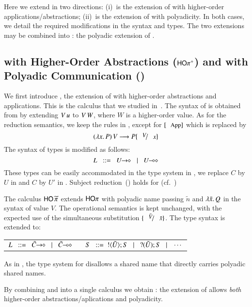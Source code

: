 



Here we extend \HOp in two directions: %
(i)~\HOpp is the extension of \HOp with higher-order applications/abstractions;
(ii)~\PHOp is the extension of \HOp
with polyadicity.
In both cases, we detail the
required modifications in the syntax and types.
The two extensions may be combined into \PHOpp: the polyadic extension of \HOpp.


\subsection{\HOp with Higher-Order Abstractions ($\mathsf{HO\pi^{+}}$) and 
with Polyadic Communication (\PHOp)
}
We first introduce \HOpp, the  extension of \HOp with higher-order abstractions and applications.
This is the calculus that we studied in~\cite{characteristic_bis}. The syntax of \HOpp is obtained 
from   by extending
$V\, {u}$ to $V\, {W}$, where  $W$ is a higher-order value. 
As for the reduction semantics, we keep the rules in , except for 
 $\orule{App}$ which is replaced by 
\[
	\appl{(\abs{x}{P})}{V} \red P \subst{V}{x}
\]
The syntax of types is modified as follows: %
$$
		L \bnfis \shot{U} \bnfbar \lhot{U}
$$
These types can be easily accommodated in the type system in , 
we replace $C$ by $U$ in  and $C$ by $U'$ in . Subject
reduction~() holds for \HOpp (cf.~\cite{characteristic_bis})

%
The calculus  
$\mathsf{HO}\,{\widetilde{\pi}}$ 
extends $\mathsf{HO}\pi$ 
with polyadic name passing $\tilde{n}$ and $\lambda \tilde{x}.\,Q$ in the syntax 
of value $V$. 
The operational semantics is kept unchanged, with the expected use of the simultaneous substitution $\subst{\tilde{V}}{\tilde{x}}$.
The type syntax is extended to: 
%
\begin{center}
	\begin{tabular}{c}
	$	L \bnfis \shot{\tilde{C}} \bnfbar \lhot{\tilde{C}}
		\quad\quad
		S \bnfis  \btout{\tilde{U}} S \bnfbar \btinp{\tilde{U}} S \bnfbar \cdots$
	\end{tabular}
\end{center}
%
As in \cite{tlca07,MostrousY15},
the type system for \PHOp 
disallows a shared name that directly carries polyadic
shared names.

By combining \HOpp and \PHOp into a single calculus we obtain \PHOpp:
the extension of \HOp allows \emph{both} higher-order
abstractions/aplications and polyadicity.
